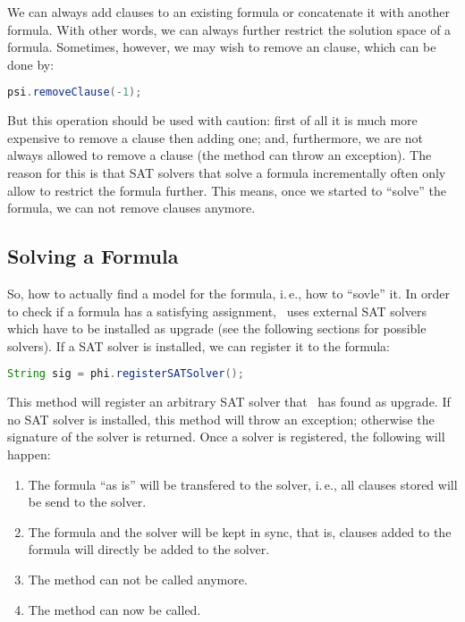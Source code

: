 \documentclass[a4paper, ukenglish, twoside, openright]{jdrasilmanual}
\begin{document}
We can always add clauses to an existing formula or concatenate it
with another formula. With other words, we can always further
restrict the solution space of a formula. Sometimes, however, we may
wish to remove an clause, which can be done by:
\begin{lstlisting}[language=Java]
  psi.removeClause(-1);
\end{lstlisting}
But this operation should be used with caution: first of all it is
much more expensive to remove a clause then adding one; and,
furthermore, we are not always allowed to remove a clause (the method
can throw an exception). The reason for this is that SAT solvers that
solve a formula incrementally often only allow to restrict the formula
further. This means, once we started to ``solve'' the formula, we
can not remove clauses anymore.

\subsection{Solving a Formula}
So, 
how to actually find a model for the formula, i.\,e., how to
``sovle'' it. In order to check if a formula has a satisfying
assignment, \Jdrasil\ uses external SAT solvers which have to be
installed as upgrade (see the following sections for possible
solvers). If a SAT solver is installed, we can register it to the
formula:
\begin{lstlisting}[language=Java]
  String sig = phi.registerSATSolver();
\end{lstlisting}
This method will register an arbitrary SAT solver that \Jdrasil\ has
found as upgrade. If no SAT solver is installed, this method will
throw an exception; otherwise the signature of the solver is
returned. Once a solver is registered, the following will happen:
\begin{enumerate}
  \item The formula ``as is'' will be transfered to the solver,
    i.\,e., all clauses stored will be send to the solver.
  \item The formula and the solver will be kept in sync, that is,
    clauses added to the formula will directly be added to the solver.
  \item The method  can not be called
    anymore.
  \item The method  can now be called.
\end{enumerate}
\end{document}
